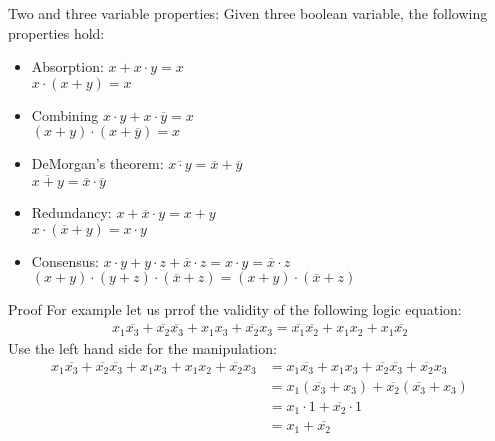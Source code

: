 \begin{parag}{Two and three variable properties:}
    Given three boolean variable, the following properties hold:
    \begin{itemize}
        \item Absorption: $x + x \cdot y = x$ \\ $x \cdot (x + y) = x$
        \item Combining $ x \cdot y + x \cdot \overline{y} = x$ \\ $ (x + y) \cdot (x + \overline{y}) = x$
        \item DeMorgan's theorem: $ \overline{x \cdot y} =  \overline{x} + \overline{y}$ \\ $\overline{x + y} = \overline{x} \cdot \overline{y}$ 
        \item Redundancy: $x + \overline{x} \cdot y = x + y$ \\ $x \cdot ( \overline{x} + y)  =  x \cdot y$
        \item Consensus: $x \cdot y + y \cdot z + \overline{x} \cdot z = x \cdot y = \overline{x} \cdot z$ \\ $(x + y) \cdot (y + z) \cdot ( \overline{x} + z) = (x + y) \cdot ( \overline{x} + z)$
    \end{itemize}
    \begin{subparag}{Proof}
        For example let us prrof the validity  of the following logic equation:
        \begin{align*}
            x_1 \overline{x_3} + \overline{x_2} \overline{x_3} + x_1x_3 + \overline{x_2}x_3 = \overline{x_1} \overline{x_2} + x_1x_2 + x_1 \overline{x_2}
        \end{align*}
        Use the left hand side for the manipulation:
        \begin{align*}
            x_1 \overline{x_3} + \overline{x_2} \overline{x_3} + x_1x_3 + x_1x_2 + \overline{x_2}x_3 &= x_1 \overline{x_3} + x_1x_3 + \overline{x_2} \overline{x_3} + \overline{x_2}x_3 \\
                                                                                                     &= x_1( \overline{x_3} + x_3) + \overline{x_2}( \overline{x_3} + x_3) \\
                                                                                                     &= x_1 \cdot 1 + \overline{x_2} \cdot 1 \\
                                                                                                     &= x_1 + \overline{x_2}
        \end{align*}
    \end{subparag}
\end{parag}
